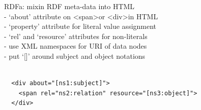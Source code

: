 RDFa: mixin RDF meta-data into HTML \\
- `about' attribute on \textless span\textgreater or \textless div\textgreater in HTML \\
- `property' attribute for literal value assignment \\
- `rel' and `resource' attributes for non-literals \\
- use XML namespaces for URI of data nodes \\
- put `[]' around subject and object notations \\
\\
\begin{verbatim}
  <div about="[ns1:subject]">
    <span rel="ns2:relation" resource="[ns3:object]">
  </div>
\end{verbatim}

